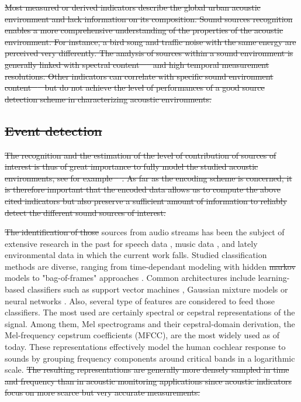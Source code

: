 \documentclass[sensors,article,submit,moreauthors,pdftex,10pt,a4paper]{mdpi}
\providecommand{\DIFaddtex}[1]{{\protect\color{blue}\uwave{#1}}} %
\providecommand{\DIFdeltex}[1]{{\protect\color{red}\sout{#1}}}                      %
\providecommand{\DIFaddbegin}{} %
\providecommand{\DIFaddend}{} %
\providecommand{\DIFdelbegin}{} %
\providecommand{\DIFdelend}{} %
\providecommand{\DIFadd}[1]{\texorpdfstring{\DIFaddtex{#1}}{#1}} %
\providecommand{\DIFdel}[1]{\texorpdfstring{\DIFdeltex{#1}}{}} %
\begin{document}
\DIFdel{Most measured or derived indicators describe the global urban acoustic environment and lack information on its composition. Sound sources recognition enables a more comprehensive understanding of the properties of the acoustic environment. For instance, a bird song and traffic noise with the same energy are perceived very differently. The analysis of sources within a sound environment is generally linked with spectral content \mbox{%
\cite{ishiyama2000} }%
and high temporal measurement resolutions. Other indicators can correlate with specific sound environment content \mbox{%
\cite{aumond2017} }%
but do not achieve the level of performances of a good source detection scheme in characterizing acoustic environments.
}%

\subsection{\DIFdel{Event detection}}
\addtocounter{subsection}{-1}%

\DIFdel{The recognition and the estimation of the level of contribution of sources of interest is thus of great importance to fully model the studied acoustic environments, see for example \mbox{%
\cite{alsina2016design, app7020146, gloaguen2016estimating}}%
. As far as the encoding scheme is concerned, it is therefore important that the encoded data allows us to compute the above cited indicators but also preserve a sufficient amount of information to reliably detect the different sound sources of interest.
}%

\DIFdel{The identification of those }\DIFdelend \DIFaddbegin \DIFadd{The identification of }\DIFaddend sources from audio streams has been the subject of extensive research in the past for speech data \cite{anusuya2009}, music data \cite{tzanetakis2002}, and lately environmental data in which the current work falls. Studied classification methods are diverse, ranging from time-dependant modeling with hidden \DIFdelbegin \DIFdel{markov }\DIFdelend \DIFaddbegin \DIFadd{Markov }\DIFaddend models \cite{ntalampiras2014} to "bag-of-frames" approaches \cite{aucouturier2007, foggia2015}. Common architectures include learning-based classifiers such as support vector machines \cite{kumar2016}, Gaussian mixture models \cite{radhakrishnan2005} or neural networks \cite{salamon2017, piczak2015}. Also, several type of features are considered to feed those classifiers. The most used are certainly spectral \cite{khunarsal2013} or cepstral \cite{couvreur2004} representations of the signal. Among them, Mel spectrograms and their cepstral-domain derivation, the Mel-frequency cepstrum coefficients (MFCC), are the most widely used as of today. These representations effectively model the human cochlear response to sounds by grouping frequency components around critical bands in a logarithmic scale. \DIFdelbegin \DIFdel{The resulting representations are generally more densely sampled in time and frequency than in acoustic monitoring applications since acoustic indicators focus on more scarce but very accurate measurements.
}%
\end{document}
